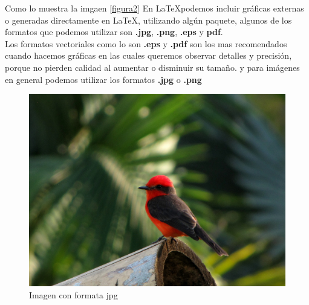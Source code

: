 \documentclass[12pt]{article}
\begin{document}
Como lo muestra la imgaen \eqref{figura2}
En \LaTeX podemos incluir gráficas externas o generadas
directamente en \LaTeX , utilizando algún paquete, algunos de los formatos que podemos utilizar son \textbf{.jpg}, \textbf{.png}, \textbf{.eps} y \textbf{pdf}.\\[0.5cm]
Los formatos vectoriales como lo son \textbf{.eps} y \textbf{.pdf} son los mas recomendados cuando hacemos gráficas en las cuales queremos observar detalles y precisión, porque no pierden calidad al aumentar o disminuir su tamaño. y para imágenes en general podemos utilizar los formatos \textbf{.jpg} o \textbf{.png}

\begin{figure}[H]
\centering
\includegraphics[scale=0.15]{figuras/Petirrojo2} 
\caption{Imagen con formata jpg}
\label{figura3}
\end{figure}

\newpage
\end{document}
